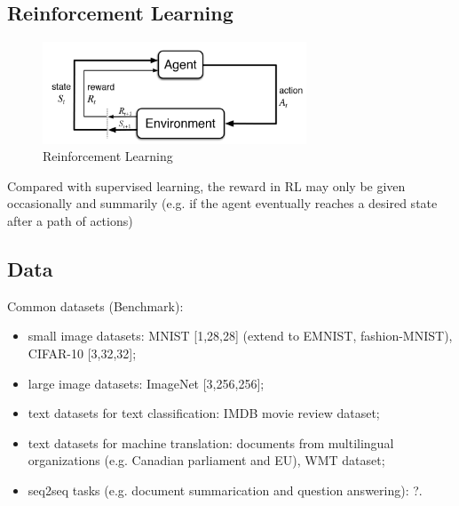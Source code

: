 \subsection{Reinforcement Learning}
\begin{figure}[htpb]
    \centering
    \includegraphics[width=0.7\textwidth]{figs/rl.png}
    \caption{Reinforcement Learning\protect\footnotemark[1]}
    \label{fig:rldiag}
\end{figure}


Compared with supervised learning, the reward in RL may only be given occasionally and summarily
(e.g. if the agent eventually reaches a desired state after a path of actions)

\subsection{Data}

Common datasets (Benchmark):
\begin{itemize}
    \item small image datasets: MNIST [1,28,28] (extend to EMNIST, fashion-MNIST), CIFAR-10 [3,32,32];
    \item large image datasets: ImageNet [3,256,256];
    \item text datasets for text classification: IMDB movie review dataset;
    \item text datasets for machine translation: documents from multilingual organizations 
    (e.g. Canadian parliament and EU), WMT dataset;
    \item seq2seq tasks (e.g. document summarication and question answering): ?.
\end{itemize}

